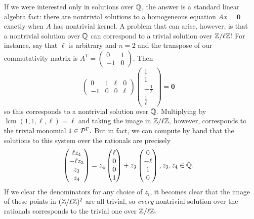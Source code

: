 \documentclass [11pt, proquest] {uwthesis}[2020/02/24]
\begin{document}
{    If we were interested only in solutions over $\mathbb{Q}$, the answer is a standard linear algebra fact: there are nontrivial solutions to a homogeneous equation $Ax=\mathbf 0$ exactly when $A$ has nontrivial kernel. A problem that can arise, however, is that a nontrivial solution over $\mathbb{Q}$ can correspond to a trivial solution over $\mathbb{Z}/\ell\mathbb{Z}!$ For instance, say that $\ell$ is arbitrary and $n=2$ and the transpose of our commutativity matrix is $A^T=(\begin{smallmatrix}
        0&1\\-1&0
    \end{smallmatrix}).$ Then 
    \[\begin{pmatrix}
        0 & 1 & \ell & 0\\ -1 & 0 & 0 & \ell
    \end{pmatrix}\begin{pmatrix}
        1 \\ 1 \\ -\frac{1}{\ell} \\ \frac{1}{\ell}
    \end{pmatrix}=\mathbf 0\]
    so this corresponds to a nontrivial solution over $\mathbb{Q}$. Multiplying by $\operatorname{lcm}(1,1,\ell,\ell)=\ell$ and taking the image in $\mathbb{Z}/\ell\mathbb{Z},$ however, corresponds to the trivial monomial $1\in\mathcal{P}^\Gamma.$ But in fact, we can compute by hand that the solutions to this system over the rationals are precisely
    \[\begin{pmatrix}
        \ell z_4 \\ -\ell z_3 \\ z_3\\ z_4
    \end{pmatrix}=z_4\begin{pmatrix}
        \ell \\ 0 \\ 0 \\ 1
    \end{pmatrix} + z_3\begin{pmatrix}
        0 \\ -\ell \\1 \\ 0
    \end{pmatrix}, z_3,z_4\in\mathbb{Q}.\]
    If we clear the denominators for any choice of $z_i$, it becomes clear that the image of these points in $(\mathbb{Z}/\ell\mathbb{Z})^2$ are all trivial, so \textit{every} nontrivial solution over the rationals corresponds to the trivial one over $\mathbb{Z}/\ell\mathbb{Z}.$
    
}
\end{document}
